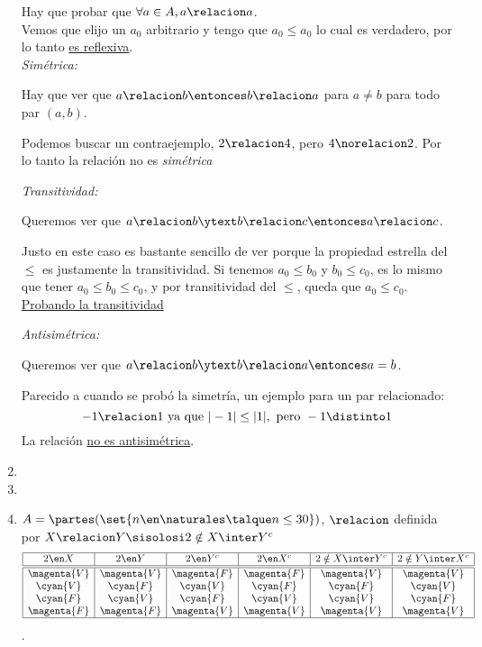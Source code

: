 \begin{enumerate}[label=\roman*)]
        Hay que probar que $\forall a \in A, a \relacion a$. \\
        Vemos que elijo un $a_0$ arbitrario y tengo que $a_0 \leq a_0$ lo cual es verdadero, por lo tanto \underline{es reflexiva}. \\

        \textit{Simétrica: }

        Hay que ver que $a \relacion b \entonces b \relacion a$ para $a\neq b$ para todo par $(a,b)$.

        Podemos buscar un contraejemplo, $2 \relacion 4$, pero $4 \norelacion 2$. Por lo tanto la relación
        no es \textit{simétrica}

        \textit{Transitividad: }

        Queremos ver que $a \relacion b \ytext b \relacion c \entonces a \relacion c$.

        Justo en este caso es bastante sencillo de ver porque la propiedad estrella del $\leq$ es justamente la transitividad.
        Si tenemos $a_0 \leq b_0$ y $b_0 \leq c_0$, es lo mismo que tener $a_0 \leq b_0 \leq c_0$, y por transitividad del $\leq$,
        queda que $a_0 \leq c_0$. \underline{Probando la transitividad}

        \textit{Antisimétrica: }

        Queremos ver que $a \relacion b \ytext b \relacion a \entonces a = b$.

        Parecido a cuando se probó la simetría, un ejemplo para un par relacionado:
        $$
        -1 \relacion 1 \text{ ya que } |-1| \leq |1|, \text{ pero } -1 \distinto 1 
        $$
        La relación \ul{no es antisimétrica}.

  \item \hacer

  \item \hacer

  \item $
          A =
          \partes(\set{n \en \naturales \talque n \leq 30})$, $\relacion$ definida por $X \relacion Y \sisolosi 2 \notin X \inter Y^c
        $
        $$
          \begin{array}{|c|c|c|c|c|c|}
            \hline
            2 \en X     & 2 \en Y     & 2 \en Y^c   & 2 \en X^c   & 2 \notin X \inter Y^c & 2 \notin Y \inter X^c \\ \hline  \hline
            \magenta{V} & \magenta{V} & \magenta{F} & \magenta{F} & \magenta{V}           & \magenta{V}           \\
            \cyan{V}    & \cyan{F}    & \cyan{V}    & \cyan{F}    & \cyan{F}              & \cyan{V}              \\
            \cyan{F}    & \cyan{V}    & \cyan{F}    & \cyan{V}    & \cyan{V}              & \cyan{F}              \\
            \magenta{F} & \magenta{F} & \magenta{V} & \magenta{V} & \magenta{V}           & \magenta{V}           \\ \hline
          \end{array}$$.


\end{enumerate}
